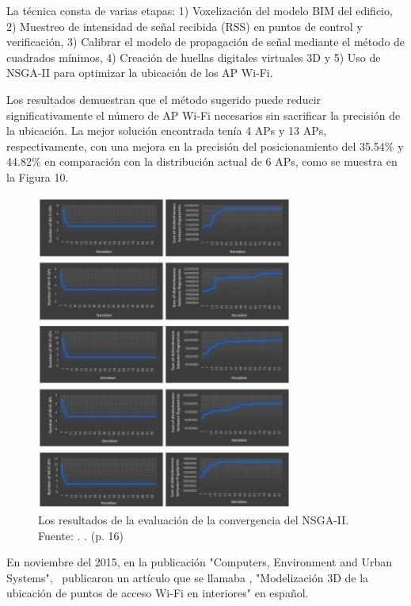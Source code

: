 La técnica consta de varias etapas: 1) Voxelización del modelo BIM del edificio, 2) Muestreo de intensidad de señal recibida (RSS) en puntos de control y verificación, 3) Calibrar el modelo de propagación de señal mediante el método de cuadrados mínimos, 4) Creación de huellas digitales virtuales 3D y 5) Uso de NSGA-II para optimizar la ubicación de los AP Wi-Fi. 

Los resultados demuestran que el método sugerido puede reducir significativamente el número de AP Wi-Fi necesarios sin sacrificar la precisión de la ubicación. La mejor solución encontrada tenía 4 APs y 13 APs, respectivamente, con una mejora en la precisión del posicionamiento del 35.54\% y 44.82\% en comparación con la distribución actual de 6 APs, como se muestra en la Figura 10.

\begin{figure}[!ht]
	\begin{center}
		\includegraphics[width=0.75\textwidth]{2/figures/hosseini2023.png}
		\caption[Los resultados de la evaluación de la convergencia del NSGA-II]{Los resultados de la evaluación de la convergencia del NSGA-II.\\
		Fuente: \cite{pr_hosseini2023NSGAIIap}. . (p. 16)}
		\label{2:fig118}
	\end{center}
\end{figure}

En noviembre del 2015, en la publicación "Computers, Environment and Urban Systems", \cite{pr_lee2015coverage3d} publicaron un artículo que se llamaba , "Modelización 3D de la ubicación de puntos de acceso Wi-Fi en interiores" en español.

